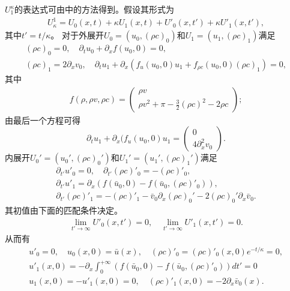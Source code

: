$U^\kappa_1$的表达式可由\cite{yong1992singular,yong1999singular}中的方法得到。假设其形式为
\begin{eqnarray*}
U^1_\kappa  = U_0(x,t) + \kappa U_1(x,t) + U'_0(x,t') + \kappa U'_1(x,t'),
\end{eqnarray*}
其中$t'=t/\kappa$。
对于外展开$U_0=(u_0, (\rho c)_0)$和$U_1=(u_1, (\rho c)_1)$满足
\begin{eqnarray}
 (\rho c)_0 = 0, \quad
  \partial_t u_0+ \partial_x f(u_0,0)=0 , \nonumber \\
  (\rho c)_1 = 2\partial_x v_0, \quad
  \partial_t u_1 + \partial_x (f_u(u_0,0) u_1 + f_{\rho c}(u_0,0)(\rho c)_1)  = 0 \label{54},
	\end{eqnarray}
其中
\begin{eqnarray*}
  f(\rho,\rho v,\rho c) = \left( \begin{array}{cc} \rho v \\ \rho v^2 + \pi - \frac{3}{2} (\rho c)^2 - 2\rho c \end{array} \right);
\end{eqnarray*}
由最后一个方程可得
\begin{equation*}
	  \partial_t u_1 + \partial_x (f_u(u_0,0) u_1   = \left( \begin{matrix}
	  		0 \\ 4 \partial_x^2 v_0
	  \end{matrix} \right).
\end{equation*}
内展开$U_0'=(u_0', (\rho c)_0')$和$U_1'=(u_1', (\rho c)_1')$满足
\begin{eqnarray*}
 \partial_{t'} u'_0 = 0,  \quad \partial_{t'} (\rho c)'_0 = -(\rho c)'_0 , \\
  \partial_{t'} u'_1 = \partial_x(f(\bar u_0,0) - f(\bar u_0,(\rho c)'_0)), \\
  \partial_{t'} (\rho c)'_1 = - (\rho c)'_1 - \bar v_0 \partial_x (\rho c)_0' -2 (\rho c)_0'\partial_x \bar v_0.
\end{eqnarray*}
其初值由下面的匹配条件决定。
\begin{eqnarray*}
  \lim_{t' \to \infty} U'_0(x,t') = 0 , \quad \lim_{t' \to \infty} U'_1(x,t') = 0 .
\end{eqnarray*}
从而有
\begin{eqnarray*}
 u'_0 =0, \quad u_0(x,0) = \bar{u}(x), \quad  (\rho c)'_0 = (\rho c)'_0(x,0)e^{-t/\kappa}=0 , \\[4mm]
 u'_1(x,0) = -\partial_x\int_0^{+\infty} (f(\bar u_0,0) - f(\bar u_0,(\rho c)'_0)) dt'=0\\
 u_1(x,0) =  - u'_1(x,0)=0, \quad (\rho c)'_1(x,0) = - 2\partial_x\bar v_0(x).
\end{eqnarray*}

